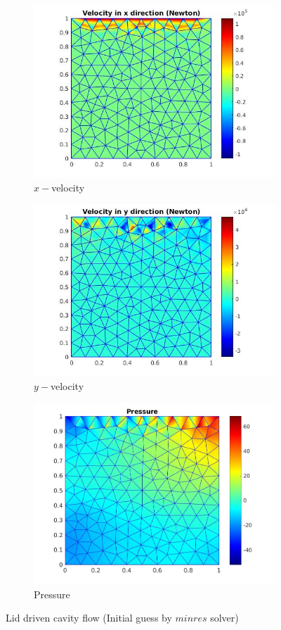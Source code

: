 \documentclass[a4paper,twoside,openright]{book}
\begin{document}
\begin{figure}
  \begin{subfigure}{\textwidth}
    \includegraphics[width=0.8\linewidth]{lid_newton_vx_minres.jpg}
    \caption{$x-$velocity}
  \label{x_vel_navier_stoke_minres_lid}
  \end{subfigure}
  \begin{subfigure}{\textwidth}
    \includegraphics[width=0.8\linewidth]{lid_newton_vy_minres.jpg}
    \caption{$y-$velocity}
  \label{y_vel_navier_stoke_minres_lid}
  \end{subfigure}
  \begin{subfigure}{\textwidth}
    \includegraphics[width=0.8\linewidth]{lid_newton_pressure_minres.jpg}
    \caption{Pressure}
  \label{pressure_navier_stoke_minres_lid}
  \end{subfigure}
\caption{Lid driven cavity flow (Initial guess by $minres$ solver)}
\label{lid_driven_cavity_n_s_minres}
\end{figure}
\end{document}
